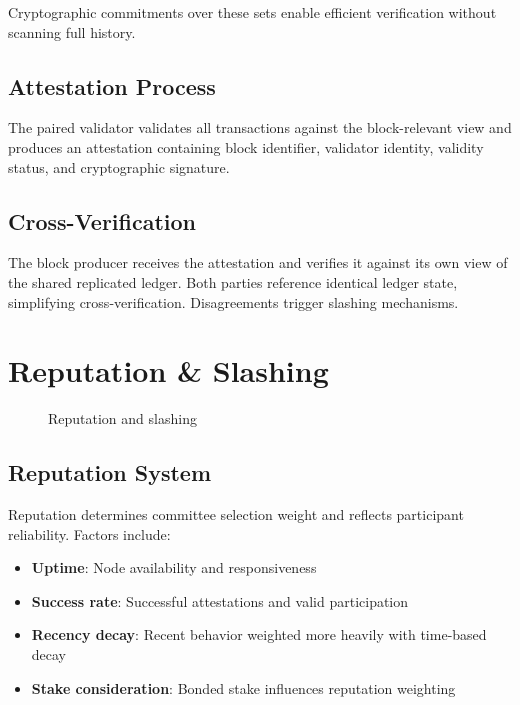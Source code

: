 \documentclass[11pt,a4paper]{article}
\begin{document}
Cryptographic commitments over these sets enable efficient verification without scanning full history.

\subsection{Attestation Process}
The paired validator validates all transactions against the block-relevant view and produces an attestation containing block identifier, validator identity, validity status, and cryptographic signature.

\subsection{Cross-Verification}
The block producer receives the attestation and verifies it against its own view of the shared replicated ledger. Both parties reference identical ledger state, simplifying cross-verification. Disagreements trigger slashing mechanisms.

\section{Reputation \& Slashing}
\begin{figure}[H]
\centering
{}
\caption{Reputation and slashing}
\label{fig:reputation}
\end{figure}

\subsection{Reputation System}
Reputation determines committee selection weight and reflects participant reliability. Factors include:
\begin{itemize}
\item \textbf{Uptime}: Node availability and responsiveness
\item \textbf{Success rate}: Successful attestations and valid participation
\item \textbf{Recency decay}: Recent behavior weighted more heavily with time-based decay
\item \textbf{Stake consideration}: Bonded stake influences reputation weighting
\end{itemize}
\end{document}
